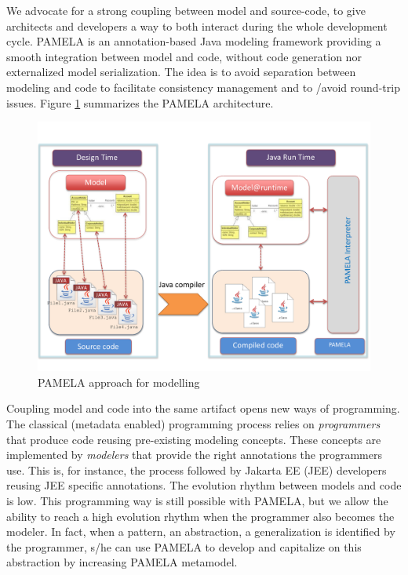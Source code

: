 We advocate for a strong coupling between model and source-code, to give architects and developers a way to both interact during the whole development cycle. PAMELA is an annotation-based Java modeling framework providing a smooth integration between model and code, without code generation nor externalized model serialization. The idea is to avoid separation between modeling and code to facilitate consistency management and to /avoid round-trip issues. Figure \ref{fig:PamelaVision} summarizes the PAMELA architecture.  

\begin{figure}
    \centering
    \includegraphics[width=1.0 \columnwidth]{PamelaVisionV2.pdf}
    \caption{PAMELA approach for modelling}
    \label{fig:PamelaVision}
\end{figure}


Coupling model and code into the same artifact opens new ways of programming. The classical (metadata enabled) programming process relies on \emph{programmers} that produce code reusing pre-existing modeling concepts. These concepts are implemented by \emph{modelers} that provide the right annotations the programmers use. This is, for instance, the process followed by Jakarta EE (JEE) developers reusing JEE specific annotations. The evolution rhythm between models and code is low. This programming way is still possible with PAMELA, but we allow the ability to reach a high evolution rhythm when the programmer also becomes the modeler. In fact, when a pattern, an abstraction, a generalization is identified by the programmer, s/he can use PAMELA to develop and capitalize on this abstraction by increasing PAMELA metamodel. 

